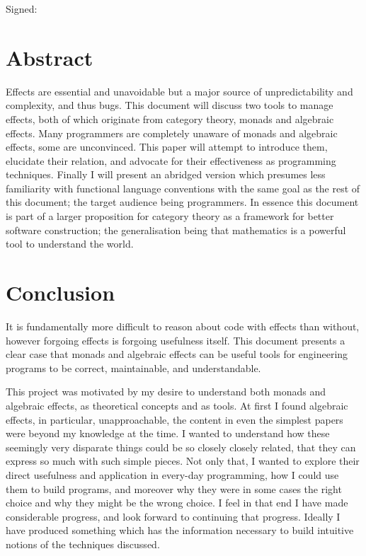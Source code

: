 \documentclass[a4paper,10pt]{article}
\newenvironment{spaced}[1]
  {\begin{minipage}[c]{\textwidth}\vspace{#1}}
  {\end{minipage}}
\theoremstyle{definition}
\begin{document}
  \begin{spaced}{5em}
    Signed:
  \end{spaced}
\pagebreak

\section{Abstract}
Effects are essential and unavoidable
but a major source of unpredictability
and complexity, and thus bugs.
This document will discuss two tools to manage effects,
both of which originate from category theory,
monads and algebraic effects.
Many programmers are completely unaware of monads and algebraic effects,
some are unconvinced.
This paper will attempt to introduce them,
elucidate their relation,
and advocate for their effectiveness as programming techniques.
Finally I will present an abridged version
which presumes less familiarity with functional language conventions
with the same goal as the rest of this document;
the target audience being programmers.
In essence this document is part of a larger
proposition for category theory as a framework for better software construction;
the generalisation being that mathematics is a powerful tool to understand the world.

\pagebreak
\tableofcontents

\pagebreak


\pagebreak


\pagebreak


\pagebreak


\pagebreak


\pagebreak
\section{Conclusion}
It is fundamentally more difficult to reason about code with effects
than without, however forgoing effects is forgoing usefulness itself.
This document presents a clear case that monads and algebraic effects
can be useful tools for engineering programs to be correct, maintainable, and understandable.

This project was motivated by my desire to understand both monads and algebraic effects,
as theoretical concepts and as tools.
At first I found algebraic effects, in particular, unapproachable,
the content in even the simplest papers were beyond my knowledge at the time.
I wanted to understand how these seemingly very disparate
things could be so closely closely related,
that they can express so much with such simple pieces.
Not only that, I wanted to explore
their direct usefulness and application in
every-day programming,
how I could use them to build programs,
and moreover why they were in some cases the right choice
and why they might be the wrong choice.
I feel in that end I have made considerable progress,
and look forward to continuing that progress.
Ideally I have produced something which has the information
necessary to build intuitive notions of the techniques discussed.
\end{document}
